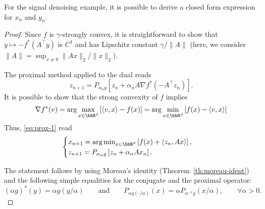  \begin{remark}
     For the signal denoising example, it is possible to derive a closed form expression for $x_n$ and $y_n$.
 \end{remark}
 
 \begin{proof}
     Since $f$ is $\gamma$-strongly convex, it is straightforward to show that $y\mapsto -f^*(A^\top y)$ is $C^1$ and has Lipschitz constant $\gamma/\|A\|$ (here, we consider $\|A\|=\sup_{x\neq 0} \|Ax\|_2/\|x\|_2$).
 
     The proximal method applied to the dual reads
     \begin{equation}
         \label{eq:prox-1}
         z_{n+1} = P_{\alpha_n g}\left[ z_n + \alpha_n A \nabla f^*(-A^\top z_n) \right].
     \end{equation}
     It is possible to show that the strong convexity of $f$ implies
     \begin{equation}
         \nabla f^* (v) = \arg\max_{x\in\bbR^d} \left[\langle v,x\rangle - f(x) \right]
         = \arg\min_{x\in\bbR^d} \left[f(x)-\langle v,x\rangle \right]
     \end{equation}
     Thus, \eqref{eq:prox-1} read
     \begin{equation}
         \begin{cases}
             x_{n+1} =\arg\min_{x\in\bbR^d} \left[f(x)+\langle z_n,Ax\rangle \right] , \\
             z_{n+1}=P_{\alpha_n g}\left[ z_n + \alpha_n A x_n \right].
         \end{cases}
     \end{equation}
 
     The statement follows by using Moreau's identity (Theorem~\ref{th:moreau-ident}) and the following simple equalities for the conjugate and the proximal operator:
     \begin{equation}
         (\alpha g)^*(y) = \alpha g(y / \alpha)
         \qquad\text{and}\qquad
         P_{\alpha g(\cdot/\alpha)} (x) = \alpha P_{\alpha^{-1}g}(x/\alpha),
         \qquad \forall\alpha>0.
     \end{equation}
 \end{proof}
 
